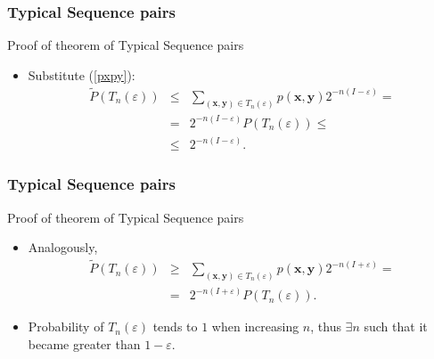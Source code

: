 \documentclass[14pt]{beamer}
\renewcommand{\vec}[1]{\ensuremath{\boldsymbol{#1}}}
\begin{document}
\begin{frame}
\frametitle{Typical Sequence pairs}
Proof of theorem of Typical Sequence pairs
\begin{itemize}
    
    \item Substitute (\ref{pxpy}):
    \begin{eqnarray*}
    \tilde P\left(T_n(\varepsilon)\right)
            &\le&  \sum_{({\vec x}, {\vec y})\in T_n(\varepsilon)}
     p({\vec x},{\vec y})2^{-n(I-\varepsilon)}=
     \\
     &=&2^{-n(I-\varepsilon)} P\left(T_n(\varepsilon)\right)
    \le \\
     &\le&2^{-n(I-\varepsilon)}.
    \end{eqnarray*}

\end{itemize}
\end{frame}



\begin{frame}
\frametitle{Typical Sequence pairs}
Proof of theorem of Typical Sequence pairs
\begin{itemize}
    
    \item Analogously,
    \begin{eqnarray*}
    \tilde P\left(T_n(\varepsilon)\right) &\ge&
    \sum_{( {\vec x},  {\vec y})\in T_n(\varepsilon)}
     p({\vec x}, {\vec y})2^{-n(I+\varepsilon)}=
     \\
     &=&2^{-n(I+\varepsilon)}
     P\left(T_n(\varepsilon)\right) .
    \end{eqnarray*}
    
    \item Probability of $T_n(\varepsilon)$ tends to $1$ when increasing $n$, thus $\exists n$ such that it became greater than $1-\varepsilon$. \QED
    
\end{itemize}
\end{frame}
\end{document}
